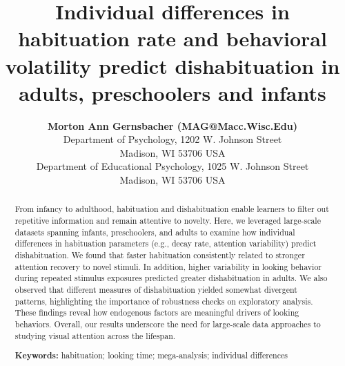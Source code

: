 \documentclass[10pt, letterpaper]{article}
\title{Individual differences in habituation rate and behavioral
volatility predict dishabituation in adults, preschoolers and infants}
\author{{\large \bf Morton Ann Gernsbacher (MAG@Macc.Wisc.Edu)} \\ Department of Psychology, 1202 W. Johnson Street \\ Madison, WI 53706 USA \AND {\large \bf Sharon J.~Derry (SDJ@Macc.Wisc.Edu)} \\ Department of Educational Psychology, 1025 W. Johnson Street \\ Madison, WI 53706 USA}
\begin{document}
\maketitle

\begin{abstract}
From infancy to adulthood, habituation and dishabituation enable
learners to filter out repetitive information and remain attentive to
novelty. Here, we leveraged large-scale datasets spanning infants,
preschoolers, and adults to examine how individual differences in
habituation parameters (e.g., decay rate, attention variability) predict
dishabituation. We found that faster habituation consistently related to
stronger attention recovery to novel stimuli. In addition, higher
variability in looking behavior during repeated stimulus exposures
predicted greater dishabituation in adults. We also observed that
different measures of dishabituation yielded somewhat divergent
patterns, highlighting the importance of robustness checks on
exploratory analysis. These findings reveal how endogenous factors are
meaningful drivers of looking behaviors. Overall, our results underscore
the need for large-scale data approaches to studying visual attention
across the lifespan.

\textbf{Keywords:}
habituation; looking time; mega-analysis; individual differences
\end{abstract}
\end{document}
